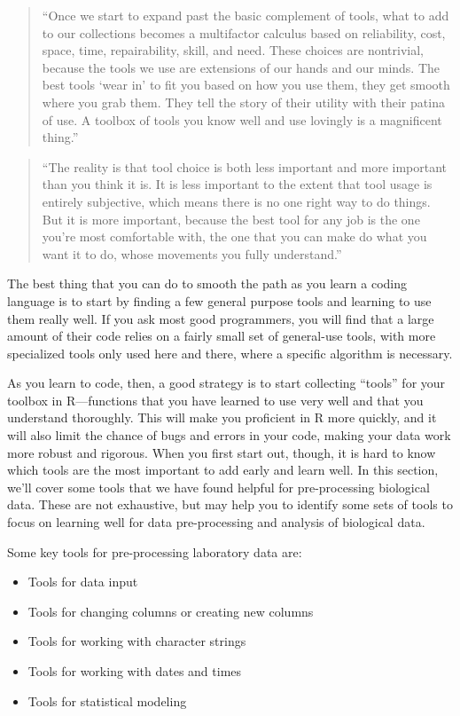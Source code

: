\documentclass[]{tufte-book}
\providecommand{\tightlist}{%
  \setlength{\itemsep}{0pt}\setlength{\parskip}{0pt}}
\begin{document}
\begin{quote}
``Once we start to expand past the basic complement of tools, what to add to our
collections becomes a multifactor calculus based on reliability, cost, space, time,
repairability, skill, and need. These choices are nontrivial, because the tools we use
are extensions of our hands and our minds. The best tools `wear in' to fit you based
on how you use them, they get smooth where you grab them. They tell the story of their
utility with their patina of use. A toolbox of tools you know well and use lovingly is
a magnificent thing.'' \citep{savage2020every}
\end{quote}

\begin{quote}
``The reality is that tool choice is both less important and more important than you
think it is. It is less important to the extent that tool usage is entirely
subjective, which means there is no one right way to do things. But it is more
important, because the best tool for any job is the one you're most comfortable with,
the one that you can make do what you want it to do, whose movements you fully
understand.'' \citep{savage2020every}
\end{quote}

The best thing that you can do to smooth the path as you learn a coding language
is to start by finding a few general purpose tools and learning to use them
really well. If you ask most good programmers, you will find that a large
amount of their code relies on a fairly small set of general-use tools,
with more specialized tools only used here and there, where a specific
algorithm is necessary.

As you learn to code, then, a good strategy is to start collecting ``tools'' for
your toolbox in R---functions that you have learned to use very well and that
you understand thoroughly. This will make you proficient in R more quickly, and
it will also limit the chance of bugs and errors in your code, making your data
work more robust and rigorous. When you first start out, though, it is hard to
know which tools are the most important to add early and learn well. In this
section, we'll cover some tools that we have found helpful for
pre-processing biological data. These are not exhaustive, but may help you to
identify some sets of tools to focus on learning well for data pre-processing and
analysis of biological data.

Some key tools for pre-processing laboratory data are:

\begin{itemize}
\tightlist
\item
  Tools for data input
\item
  Tools for changing columns or creating new columns
\item
  Tools for working with character strings
\item
  Tools for working with dates and times
\item
  Tools for statistical modeling
\end{itemize}
\end{document}
